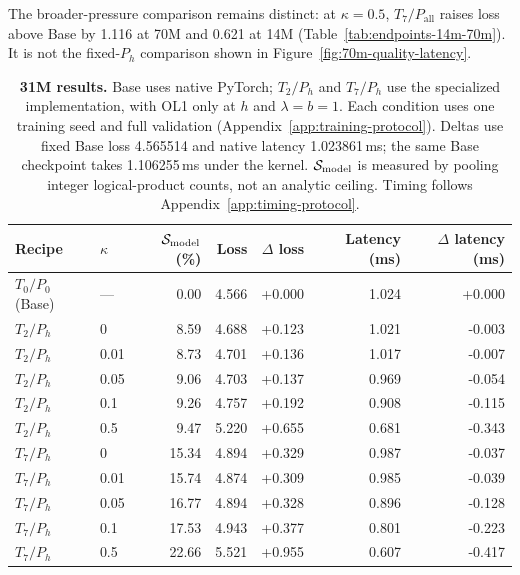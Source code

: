 The broader-pressure comparison remains distinct: at $\kappa=0.5$,
$T_7/P_{\mathrm{all}}$ raises loss above Base by 1.116 at 70M and 0.621
at 14M (Table~\ref{tab:endpoints-14m-70m}). It is not the fixed-$P_h$
comparison shown in Figure~\ref{fig:70m-quality-latency}.

\begin{table}[!htbp]
\centering\small
\setlength{\tabcolsep}{5pt}
\caption{\textbf{31M results.} Base uses native PyTorch; $T_2/P_h$ and
$T_7/P_h$ use the specialized implementation, with OL1 only at $h$ and
$\lambda=b=1$. Each condition uses one training seed and full validation
(Appendix~\ref{app:training-protocol}). Deltas use fixed Base loss 4.565514
and native latency 1.023861\,ms; the same Base checkpoint takes 1.106255\,ms
under the kernel. $\mathcal{S}_{\mathrm{model}}$ is measured by pooling integer logical-product
counts, not an analytic ceiling. Timing follows Appendix~\ref{app:timing-protocol}.}
\label{tab:31m-results}
\begin{tabular}{@{}llrrrrr@{}}
\toprule
Recipe & $\kappa$ & $\mathcal{S}_{\mathrm{model}}$ (\%) & Loss & $\Delta$ loss & Latency (ms) & $\Delta$ latency (ms) \\
\midrule
$T_0/P_0$ (Base) & --- & 0.00 & 4.566 & +0.000 & 1.024 & +0.000 \\
\midrule
$T_2/P_h$ & 0 & 8.59 & 4.688 & +0.123 & 1.021 & -0.003 \\
$T_2/P_h$ & 0.01 & 8.73 & 4.701 & +0.136 & 1.017 & -0.007 \\
$T_2/P_h$ & 0.05 & 9.06 & 4.703 & +0.137 & 0.969 & -0.054 \\
$T_2/P_h$ & 0.1 & 9.26 & 4.757 & +0.192 & 0.908 & -0.115 \\
$T_2/P_h$ & 0.5 & 9.47 & 5.220 & +0.655 & 0.681 & -0.343 \\
\midrule
$T_7/P_h$ & 0 & 15.34 & 4.894 & +0.329 & 0.987 & -0.037 \\
$T_7/P_h$ & 0.01 & 15.74 & 4.874 & +0.309 & 0.985 & -0.039 \\
$T_7/P_h$ & 0.05 & 16.77 & 4.894 & +0.328 & 0.896 & -0.128 \\
$T_7/P_h$ & 0.1 & 17.53 & 4.943 & +0.377 & 0.801 & -0.223 \\
$T_7/P_h$ & 0.5 & 22.66 & 5.521 & +0.955 & 0.607 & -0.417 \\
\bottomrule
\end{tabular}
\end{table}

\FloatBarrier

